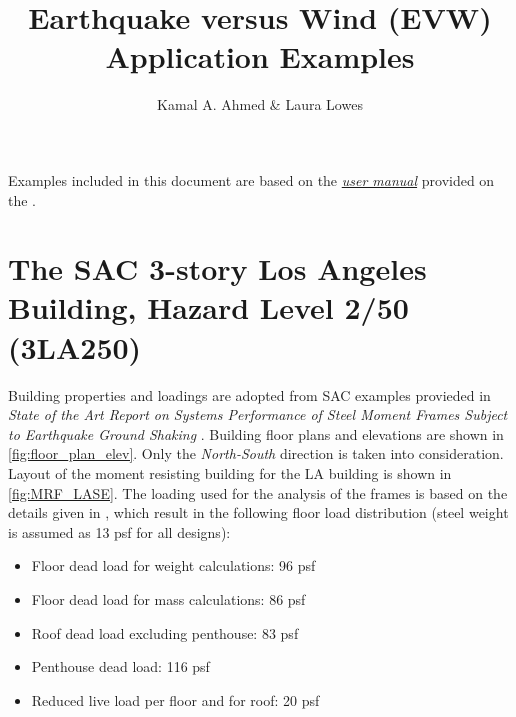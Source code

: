 \documentclass{simcenterdocumentation}
\begin{document}
\title{Earthquake versus Wind (EVW) Application Examples}

\author{Kamal A. Ahmed \& Laura Lowes}

\hypersetup{pageanchor=false}
\maketitle
\copyrightpage
\acknowledgments


\newpage

\graphicspath{{figures/}{}}

Examples included in this document are based on the \href{https://simcenter.designsafe-ci.org/media/filer_public/a0/68/a068ba45-6a47-46f4-83b1-fae585d8ccbe/evw_documentation.pdf}{\textit{user manual}} provided on the .

\renewcommand{\thesection}{Example \arabic{section}:}
\renewcommand{\thesubsection}{Example \arabic{subsection}:}

\section{The SAC 3-story Los Angeles Building, Hazard Level 2/50 (3LA250)}
Building properties and loadings are adopted from SAC examples provieded in \textit{State of the Art Report on Systems Performance of Steel Moment Frames Subject to Earthquake Ground Shaking} \cite{FEMA335c2000}. Building floor plans and elevations are shown in \cref{fig:floor_plan_elev}. Only the \textsl{North-South} direction is taken into consideration. Layout of the moment resisting building for the LA building is shown in \cref{fig:MRF_LASE}.
The loading used for the analysis of the frames is based on the details given in \cite{FEMA335c2000}, which result in the following floor load distribution (steel weight is assumed as 13 psf for all designs):

\begin{itemize}
\item[] Floor dead load for weight calculations: 96 psf
\item[] Floor dead load for mass calculations:  86 psf
\item[] Roof dead load excluding penthouse:  83 psf
\item[] Penthouse dead load:  116 psf
\item[] Reduced live load per floor and for roof: 20 psf
\end{itemize}
\end{document}
